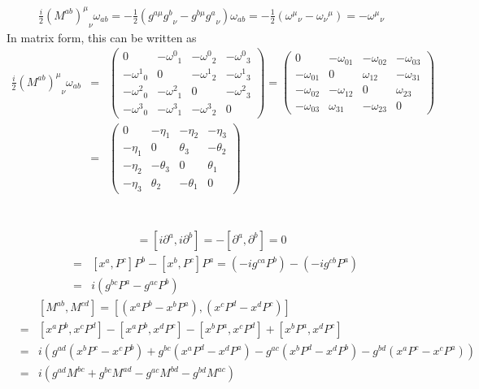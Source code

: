 \documentclass[11pt]{article}
\def\del{{\partial}}
\begin{document}
\section{ }
\begin{eqnarray}
  \frac{i}{2}{(M^{ab})^\mu}_\nu\omega_{ab}=-\frac{1}{2}( g^{a\mu} {g^b}_\nu - g^{b\mu} {g^a}_\nu ) \omega_{ab} = -\frac{1}{2}({\omega^\mu}_\nu-{\omega_\nu}^\mu)
  =-{\omega^\mu}_\nu
\end{eqnarray}
In matrix form, this can be written as
\begin{eqnarray}
  \frac{i}{2}{(M^{ab})^\mu}_\nu\omega_{ab}&=&
  \begin{pmatrix}
    0 &   -{\omega^0}_1 & -{\omega^0}_2 & -{\omega^0}_3 \\
    -{\omega^1}_0 & 0 & -{\omega^1}_2 & -{\omega^1}_3 \\
    -{\omega^2}_0 & -{\omega^2}_1 &  0 & -{\omega^2}_3 \\
    -{\omega^3}_0 & -{\omega^3}_1 &  -{\omega^3}_2 &  0  
  \end{pmatrix}
  =
  \begin{pmatrix}
    0 &  -\omega_{01} & -\omega_{02} & -\omega_{03} \\
    -\omega_{01} & 0 & \omega_{12} & -\omega_{31} \\
    -\omega_{02} & -\omega_{12} &  0 & \omega_{23} \\
    -\omega_{03} & \omega_{31} &  -\omega_{23} &  0  
  \end{pmatrix}\\
  &=&
  \begin{pmatrix}
    0 &  -\eta_{1} & -\eta_{2} & -\eta_{3} \\
    -\eta_{1} & 0 & \theta_{3} & -\theta_{2} \\
    -\eta_{2} & -\theta_{3} &  0 & \theta_{1} \\
    -\eta_{3} & \theta_{2} &  -\theta_{1} &  0  
  \end{pmatrix}
\end{eqnarray}

\section{ }
\begin{eqnarray}
  [P^a,P^b]=[i\del^a,i\del^b]=-[\del^a,\del^b]=0
\end{eqnarray}
\begin{eqnarray}
  [M^{ab},P^c]&=&[x^a,P^c]P^b-[x^b,P^c]P^a=(-ig^{ca}P^b)-(-ig^{cb}P^a) \\ 
  &=&i( g^{bc} P^a - g^{ac} P^b  )
\end{eqnarray}
\begin{eqnarray}
  &&[M^{ab},M^{cd}]=[(x^aP^b-x^bP^a),(x^cP^d-x^dP^c)]\\ 
  &=&[x^aP^b,x^cP^d]-[x^aP^b,x^dP^c]-[x^bP^a,x^cP^d]+[x^bP^a,x^dP^c]\\
  &=&i(g^{ad}(x^bP^c-x^cP^b)+g^{bc}(x^aP^d-x^dP^a)-g^{ac}(x^bP^d-x^dP^b)-g^{bd}(x^aP^c-x^cP^a))\\
  &=&i( g^{ad} M^{bc} +g^{bc} M^{ad} -g^{ac} M^{bd} -g^{bd} M^{ac} )
\end{eqnarray}
\end{document}
